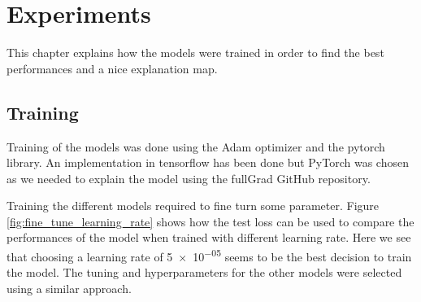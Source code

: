 \chapter{Experiments}
This chapter explains how the models were trained in order to find the best performances and a nice explanation map.
\section{Training}
Training of the models was done using the Adam\cite{kingma2014adam} optimizer and the pytorch\cite{pytorch_paszke2017automatic} library. An implementation in tensorflow\cite{tensorflow_45166} has been done but PyTorch was chosen as we needed to explain the model using the fullGrad\cite{fullgradient} GitHub repository.

Training the different models required to fine turn some parameter. Figure \ref{fig:fine_tune_learning_rate} shows how the test loss can be used to compare the performances of the model when trained with different learning rate. Here we see that choosing a learning rate of \num{5e-05} seems to be the best decision to train the model. The tuning and hyperparameters for the other models were selected using a similar approach.  

